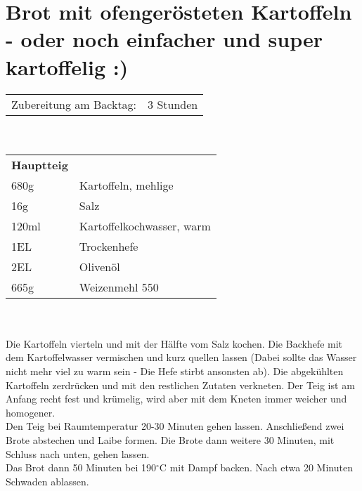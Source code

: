 \section{Brot mit ofengerösteten Kartoffeln - oder noch einfacher und super kartoffelig :)}
\begin{tabular}{ll}
    Zubereitung am Backtag:& 3 Stunden\\
\end{tabular}\\\paragraph*{}
\begin{tabular}{ll}
    \textbf{Hauptteig} \\
    680g  & Kartoffeln, mehlige       \\
    16g   & Salz                      \\
    120ml & Kartoffelkochwasser, warm \\
    1EL   & Trockenhefe               \\
    2EL   & Olivenöl                  \\
    665g  & Weizenmehl 550            \\
\end{tabular}\\\paragraph*{}
Die Kartoffeln vierteln und mit der Hälfte vom Salz kochen. Die Backhefe mit dem Kartoffelwasser vermischen und kurz quellen lassen (Dabei sollte das Wasser nicht mehr viel zu warm sein - Die Hefe stirbt ansonsten ab). Die abgekühlten Kartoffeln zerdrücken und mit den restlichen Zutaten verkneten. Der Teig ist am Anfang recht fest und krümelig, wird aber mit dem Kneten immer weicher und homogener.\\
Den Teig bei Raumtemperatur 20-30 Minuten gehen lassen. Anschließend zwei Brote abstechen und Laibe formen. Die Brote dann weitere 30 Minuten, mit Schluss nach unten, gehen lassen.\\
Das Brot dann 50 Minuten bei 190$^\circ$C mit Dampf backen. Nach etwa 20 Minuten Schwaden ablassen.

\newpage